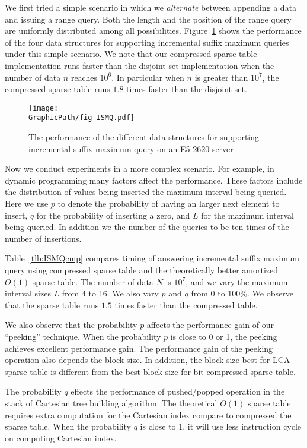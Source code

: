 We first tried a simple scenario in which we {\em alternate} between
appending a data and issuing a range query.  Both the length and the
position of the range query are uniformly distributed among all
possibilities.  Figure~\ref{fig:fig-ISMQcmp} shows the performance of
the four data structures for supporting incremental suffix maximum
queries under this simple scenario.  We note that our compressed
sparse table implementation runs faster than the disjoint set
implementation when the number of data $n$ reaches $10^6$.  In
particular when $n$ is greater than $10^7$, the compressed sparse
table runs $1.8$ times faster than the disjoint set.

\begin{figure}[!thb]
  \centering
  \texttt{[image: \\GraphicPath/fig-ISMQ.pdf]}
  \caption{The performance of the different data structures for
    supporting incremental suffix maximum query on an E5-2620 server}
  \label{fig:fig-ISMQcmp}
\end{figure}

Now we conduct experiments in a more complex scenario.  For example,
in dynamic programming many factors affect the performance. These
factors include the distribution of values being inserted the maximum
interval being queried.  Here we use $p$ to denote the probability of
having an larger next element to insert, $q$ for the probability of
inserting a zero, and $L$ for the maximum interval being queried.  In
addition we the number of the queries to be ten times of the number of
insertions.



Table~\ref{tlb:ISMQcmp} compares timing of answering incremental
suffix maximum query using compressed sparse table and the
theoretically better amortized $O(1)$ sparse table.  The number of
data $N$ is $10^7$, and we vary the maximum interval sizes $L$ from 4
to 16.  We also vary $p$ and $q$ from 0 to 100\%.  We observe that the
sparse table runs $1.5$ times faster than the compressed table.

We also observe that the probability $p$ affects the performance gain of
our ``peeking'' technique.  When the probability $p$ is close to 0 or 1,
the peeking achieves excellent performance gain.  The performance gain
of the peeking operation also depends the block size.  In addition, the
block size best for LCA sparse table is different from the best block
size for bit-compressed sparse table.

The probability $q$ effects the performance of pushed/popped operation
in the stack of Cartesian tree building algorithm.  The theoretical
$O(1)$ sparse table requires extra computation for the Cartesian index
compare to compressed the sparse table.  When the probability $q$ is
close to 1, it will use less instruction cycle on computing Cartesian
index.

